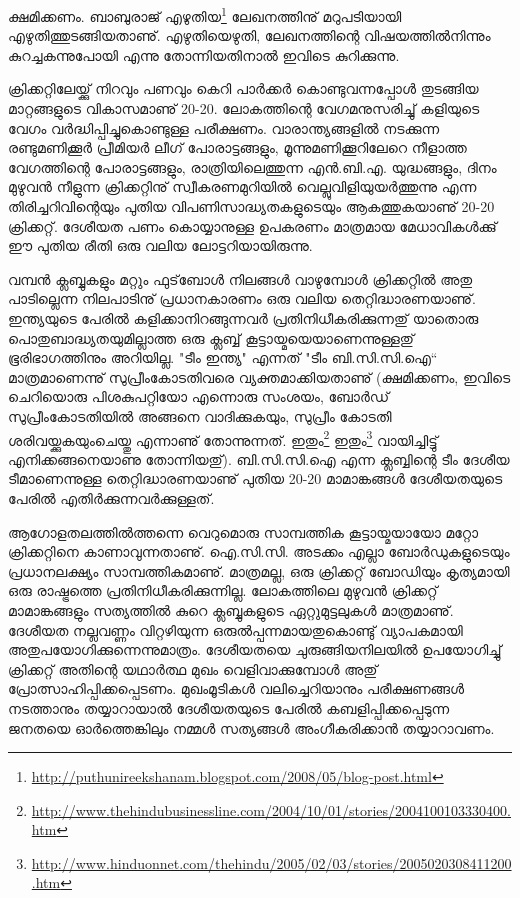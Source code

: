 ﻿
\vskip 2pt

ക്ഷമിക്കണം. ബാബുരാജ് എഴുതിയ\footnote{\url{http://puthunireekshanam.blogspot.com/2008/05/blog-post.html}} 
ലേഖനത്തിനു് മറുപടിയായി എഴുതിത്തുടങ്ങിയതാണു്. എഴുതിയെഴുതി, ലേഖനത്തിന്റെ വിഷയത്തില്‍നിന്നും കുറച്ചകന്നുപോയി 
എന്നു തോന്നിയതിനാല്‍ ഇവിടെ കുറിക്കുന്നു. 

ക്രിക്കറ്റിലേയ്ക്കു് നിറവും പണവും കെറി പാര്‍ക്കര്‍ കൊണ്ടുവന്നപ്പോള്‍ തുടങ്ങിയ മാറ്റങ്ങളുടെ വികാസമാണു് 20-20. 
ലോകത്തിന്റെ വേഗമനുസരിച്ചു് കളിയുടെ വേഗം വര്‍ദ്ധിപ്പിച്ചുകൊണ്ടുള്ള പരീക്ഷണം. വാരാന്ത്യങ്ങളില്‍ നടക്കുന്ന 
രണ്ടുമണിക്കൂര്‍ പ്രീമിയര്‍ ലീഗ് പോരാട്ടങ്ങളും, മൂന്നുമണിക്കൂറിലേറെ നീളാത്ത വേഗത്തിന്റെ പോരാട്ടങ്ങളും, 
രാത്രിയിലെത്തുന്ന എന്‍.ബി.എ. യുദ്ധങ്ങളും, ദിനം മുഴുവന്‍ നീളുന്ന ക്രിക്കറ്റിനു് സ്വീകരണമുറിയില്‍ വെല്ലുവിളിയുയര്‍ത്തുന്നു 
എന്ന തിരിച്ചറിവിന്റെയും പുതിയ വിപണിസാദ്ധ്യതകളുടെയും ആകത്തുകയാണു് 20-20 ക്രിക്കറ്റ്. 
ദേശീയത പണം കൊയ്യാനുള്ള ഉപകരണം മാത്രമായ മേധാവികള്‍ക്കു് ഈ പുതിയ രീതി ഒരു വലിയ ലോട്ടറിയായിരുന്നു.

വമ്പന്‍ ക്ലബ്ബുകളും മറ്റും ഫുട്‌ബോള്‍ നിലങ്ങള്‍ വാഴുമ്പോള്‍ ക്രിക്കറ്റില്‍ അതു പാടില്ലെന്ന നിലപാടിനു് 
പ്രധാനകാരണം ഒരു വലിയ തെറ്റിദ്ധാരണയാണു്. ഇന്ത്യയുടെ പേരില്‍ കളിക്കാനിറങ്ങുന്നവര്‍ പ്രതിനിധീകരിക്കുന്നതു് 
യാതൊരു പൊതുബാദ്ധ്യതയുമില്ലാത്ത ഒരു ക്ലബ്ബ് കൂട്ടായ്മയെയാണെന്നുള്ളതു് ഭൂരിഭാഗത്തിനും അറിയില്ല. "ടീം ഇന്ത്യ" എന്നത് "ടീം ബി.സി.സി.ഐ`` 
മാത്രമാണെന്നു് സുപ്രീംകോടതിവരെ വ്യക്തമാക്കിയതാണു് (ക്ഷമിക്കണം, ഇവിടെ ചെറിയൊരു പിശകുപറ്റിയോ എന്നൊരു സംശയം, 
ബോര്‍ഡ് സുപ്രീംകോടതിയില്‍ അങ്ങനെ വാദിക്കുകയും, സുപ്രീം കോടതി ശരിവയ്ക്കുകയുംചെയ്തു എന്നാണു് തോന്നുന്നത്. 
ഇതും\footnote{\url{http://www.thehindubusinessline.com/2004/10/01/stories/2004100103330400.htm}} 
ഇതും\footnote{\url{http://www.hinduonnet.com/thehindu/2005/02/03/stories/2005020308411200.htm}} 
വായിച്ചിട്ടു് എനിക്കങ്ങനെയാണു തോന്നിയതു്). ബി.സി.സി.ഐ എന്ന ക്ലബ്ബിന്റെ ടീം ദേശീയ ടീമാണെന്നുള്ള 
തെറ്റിദ്ധാരണയാണു് പുതിയ 20-20 മാമാങ്കങ്ങള്‍ ദേശീയതയുടെ പേരില്‍ എതിര്‍ക്കുന്നവര്‍ക്കുള്ളത്.

ആഗോളതലത്തില്‍ത്തന്നെ വെറുമൊരു സാമ്പത്തിക കൂട്ടായ്മയായോ മറ്റോ ക്രിക്കറ്റിനെ കാണാവുന്നതാണു്. 
ഐ.സി.സി. അടക്കം എല്ലാ ബോര്‍ഡുകളുടെയും പ്രധാനലക്ഷ്യം സാമ്പത്തികമാണു്. മാത്രമല്ല, ഒരു ക്രിക്കറ്റ് ബോഡിയും 
കൃത്യമായി ഒരു രാഷ്ട്രത്തെ പ്രതിനിധീകരിക്കുന്നില്ല. ലോകത്തിലെ മുഴുവന്‍ ക്രിക്കറ്റ് മാമാങ്കങ്ങളും സത്യത്തില്‍ കുറെ 
ക്ലബ്ബുകളുടെ ഏറ്റുമുട്ടലുകള്‍ മാത്രമാണു്. ദേശീയത നല്ലവണ്ണം വിറ്റഴിയുന്ന ഒരുല്‍പ്പന്നമായതുകൊണ്ടു് വ്യാപകമായി 
അതുപയോഗിക്കുന്നെന്നുമാത്രം. ദേശീയതയെ ചുരുങ്ങിയനിലയില്‍ ഉപയോഗിച്ചു് ക്രിക്കറ്റ് അതിന്റെ യഥാര്‍ത്ഥ മുഖം 
വെളിവാക്കുമ്പോള്‍ അതു് പ്രോത്സാഹിപ്പിക്കപ്പെടണം. മുഖംമൂടികള്‍ വലിച്ചെറിയാനും പരീക്ഷണങ്ങള്‍ നടത്താനും 
തയ്യാറായാല്‍ ദേശീയതയുടെ പേരില്‍ കബളിപ്പിക്കപ്പെടുന്ന ജനതയെ ഓര്‍ത്തെങ്കിലും നമ്മള്‍ സത്യങ്ങള്‍ അംഗീകരിക്കാന്‍ 
തയ്യാറാവണം.

